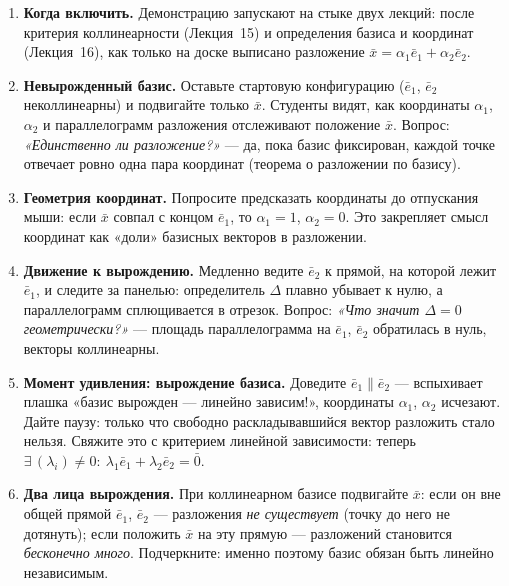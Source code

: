 \begin{enumerate}
  \item \textbf{Когда включить.} Демонстрацию запускают на стыке двух
    лекций: после критерия коллинеарности (Лекция~15) и определения
    базиса и координат (Лекция~16), как только на доске выписано
    разложение $\bar{x} = \alpha_1\bar{e}_1 + \alpha_2\bar{e}_2$.

  \item \textbf{Невырожденный базис.} Оставьте стартовую конфигурацию
    ($\bar{e}_1$, $\bar{e}_2$ неколлинеарны) и подвигайте только
    $\bar{x}$. Студенты видят, как координаты $\alpha_1$, $\alpha_2$ и
    параллелограмм разложения отслеживают положение $\bar{x}$. Вопрос:
    \emph{«Единственно ли разложение?»} --- да, пока базис фиксирован,
    каждой точке отвечает ровно одна пара координат (теорема о
    разложении по базису).

  \item \textbf{Геометрия координат.} Попросите предсказать координаты
    до отпускания мыши: если $\bar{x}$ совпал с концом $\bar{e}_1$, то
    $\alpha_1 = 1$, $\alpha_2 = 0$. Это закрепляет смысл координат как
    «доли» базисных векторов в разложении.

  \item \textbf{Движение к вырождению.} Медленно ведите $\bar{e}_2$ к
    прямой, на которой лежит $\bar{e}_1$, и следите за панелью:
    определитель $\Delta$ плавно убывает к нулю, а параллелограмм
    сплющивается в отрезок. Вопрос: \emph{«Что значит $\Delta = 0$
    геометрически?»} --- площадь параллелограмма на $\bar{e}_1$,
    $\bar{e}_2$ обратилась в нуль, векторы коллинеарны.

  \item \textbf{Момент удивления: вырождение базиса.} Доведите
    $\bar{e}_1 \parallel \bar{e}_2$ --- вспыхивает плашка «базис
    вырожден --- линейно зависим!», координаты $\alpha_1$, $\alpha_2$
    исчезают. Дайте паузу: только что свободно раскладывавшийся вектор
    разложить стало нельзя. Свяжите это с критерием линейной
    зависимости: теперь $\exists\,(\lambda_i)\neq 0:\ \lambda_1\bar{e}_1
    + \lambda_2\bar{e}_2 = \bar 0$.

  \item \textbf{Два лица вырождения.} При коллинеарном базисе подвигайте
    $\bar{x}$: если он вне общей прямой $\bar{e}_1$, $\bar{e}_2$ ---
    разложения \emph{не существует} (точку до него не дотянуть); если
    положить $\bar{x}$ на эту прямую --- разложений становится
    \emph{бесконечно много}. Подчеркните: именно поэтому базис обязан
    быть линейно независимым.


\end{enumerate}
